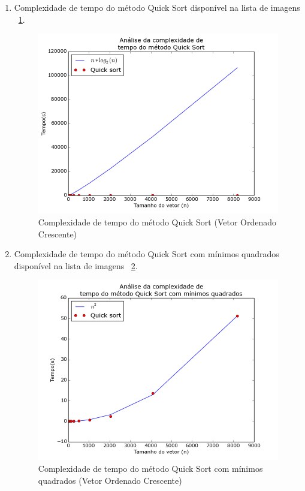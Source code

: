 \documentclass[12pt,a4paper,twoside]{report}
\begin{document}
\begin{enumerate}
\begin{enumerate}
	\end{enumerate}



			\item Complexidade de tempo do método Quick Sort disponível na lista de imagens ~\ref{fig:QuickPlot2OC}.
			\begin{figure}[!h]
				\centering
				\includegraphics[scale=0.6]{../imagens/Quick/Quick_plot_2_ordenado_crescente.png}
				\caption{Complexidade de tempo do método Quick Sort (Vetor Ordenado Crescente) \label{fig:QuickPlot2OC}}
			\end{figure}


			\item Complexidade de tempo do método Quick Sort com mínimos quadrados disponível na lista de imagens ~\ref{fig:QuickPlot3OC}.
			\begin{figure}[!h]
				\centering
				\includegraphics[scale=0.6]{../imagens/Quick/quick_plot_3_vetor_ordenado_crescente.png}
				\caption{Complexidade de tempo do método Quick Sort com mínimos quadrados (Vetor Ordenado Crescente) \label{fig:QuickPlot3OC}}
			\end{figure}

		\end{enumerate}
\end{document}
